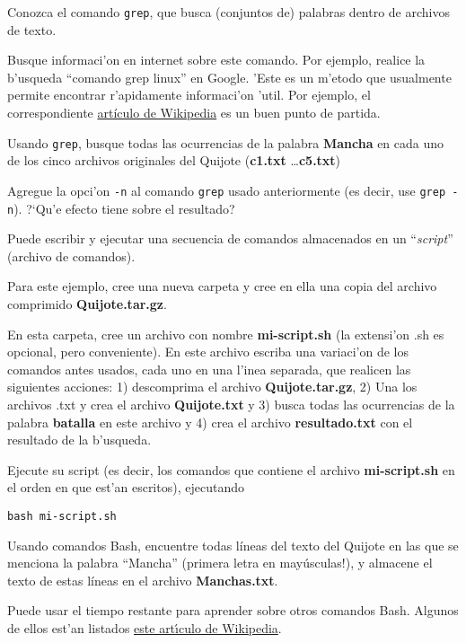 \documentclass[11pt]{exam}
\begin{document}
\begin{questions}
\item Conozca el comando \texttt{grep}, que busca (conjuntos de) palabras dentro de archivos de texto. 
\begin{parts}
\item Busque informaci'on en internet sobre este comando. Por ejemplo, realice la b'usqueda ``comando grep linux'' en Google. 'Este es un m'etodo que usualmente permite encontrar r'apidamente informaci'on 'util. Por ejemplo, el correspondiente \href{https://es.wikipedia.org/wiki/Grep}{art\'iculo de Wikipedia} es un buen punto de partida.

\item Usando \texttt{grep}, busque todas las ocurrencias de la palabra \textbf{Mancha} en cada uno de los cinco archivos originales del Quijote (\textbf{c1.txt} \dots \textbf{c5.txt})

\item Agregue la opci'on \texttt{-n} al comando \texttt{grep} usado anteriormente (es decir, use \texttt{grep -n}). ?`Qu'e efecto tiene sobre el resultado?
\end{parts}

\item Puede escribir y ejecutar una secuencia de comandos almacenados en un ``\textit{script}'' (archivo de comandos).
\begin{parts}
\item Para este ejemplo, cree una nueva carpeta y cree en ella una copia del archivo comprimido \textbf{Quijote.tar.gz}.

\item En esta carpeta, cree un archivo con nombre \textbf{mi-script.sh} (la extensi'on .sh es opcional, pero conveniente). En este archivo escriba una variaci'on de los  comandos antes usados, cada uno en una l'inea separada, que realicen las siguientes acciones: 1) descomprima el archivo \textbf{Quijote.tar.gz}, 2) Una los archivos .txt y crea el archivo \textbf{Quijote.txt} y 3) busca todas las ocurrencias de la palabra \textbf{batalla} en este archivo y 4) crea el archivo \textbf{resultado.txt} con el resultado de la b'usqueda.

\item Ejecute su script (es decir, los comandos que contiene el archivo \textbf{mi-script.sh} en el orden en que est'an escritos), ejecutando 

\begin{verbatim}
bash mi-script.sh
\end{verbatim}
\end{parts}


\item Usando comandos Bash, encuentre todas líneas del texto del Quijote en las que se menciona la palabra ``Mancha'' (primera letra en mayúsculas!), y almacene el texto de estas líneas en el archivo \textbf{Manchas.txt}.


\item Puede usar el tiempo restante para aprender sobre otros comandos Bash. Algunos de ellos est'an listados \href{https://es.wikipedia.org/wiki/Comandos_Bash}{este art{\'\i}culo de Wikipedia}.


\end{questions}
\end{document}
